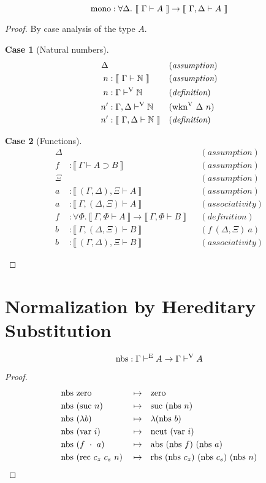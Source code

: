 \documentclass{llncs}
\newtheorem{scase}{Case}
\def\dfn{\mapsto}
\def\arr{\supset}
\def\marr{\rightarrow}
\def\app{\cdot}
\def\lam{\lambda}
\def\nat{\mathbb{N}}
\def\var{\con{var}}
\def\zero{\con{zero}}
\def\suc{\con{suc}}
\def\neut{\con{neut}}
\def\rec{\fun{rec}}
\def\rbs{\fun{rbs}}
\def\abs{\fun{abs}}
\def\mono{\fun{mono}}
\def\nbs{\fun{nbs}}
\def\bydef{(\textit{definition})}
\def\byass{(\textit{assumption})}
\newcommand{\by}[1]{(#1)}
\newcommand{\turn}[1]{\vdash^\con{#1}}
\newcommand{\all}[1]{\forall#1.~}
\newcommand{\el}[1]{\llbracket ~ #1 ~ \rrbracket}
\newcommand{\wknv}[1]{\fun{wkn}^\con{V} ~ \Delta ~ #1}
\newcommand{\con}[1]{\textmd{#1}}
\newcommand{\fun}[1]{\textmd{#1}}
\newcommand{\typm}[1]{\el{\Gamma \vdash #1}}
\newcommand{\gdtypm}[1]{\el{\Gamma, \Delta \vdash #1}}
\newcommand{\gftypm}[1]{\el{\Gamma, \Phi \vdash #1}}
\newcommand{\type}[1]{\Gamma \turn{E} #1}
\newcommand{\typv}[1]{\Gamma \turn{V} #1}
\newcommand{\gdtypv}[1]{\Gamma, \Delta \turn{V} #1}
\begin{document}
\begin{lemma}
\label{lem:mod:mono}
$$
\mono : \all{\Delta} \typm{A} \marr \gdtypm{A}
$$

\begin{proof}

By case analysis of the type $A$.

\begin{scase}[Natural numbers]
\begin{align*}
\Delta& && \byass\\
n  &: \typm{\nat} && \byass\\
n  &: \typv{\nat} && \bydef\\
n' &: \gdtypv{\nat} && \by{\wknv{n}}\\
n' &: \gdtypm{\nat} && \bydef
\end{align*}
\end{scase}

\begin{scase}[Functions]
\begin{align*}
\Delta& && \byass\\
f  &: \typm{A \arr B} && \byass\\
\Xi& && \byass\\
a  &: \el{(\Gamma, \Delta), \Xi \vdash A} && \byass\\
a  &: \el{\Gamma, (\Delta, \Xi) \vdash A} && \by{associativity}\\
f  &: \all{\Phi} \gftypm{A} \marr \gftypm{B} && \bydef\\
b  &: \el{\Gamma, (\Delta, \Xi) \vdash B} && \by{f~(\Delta,\Xi)~a}\\
b  &: \el{(\Gamma, \Delta), \Xi \vdash B} && \by{associativity}
\end{align*}
\end{scase}

\end{proof}

\end{lemma}

\section{Normalization by Hereditary Substitution}

\begin{theorem}
\label{thm:mod:nbs}
$$
\nbs : \type{A} \marr \typv{A}
$$

\begin{proof}
\begin{align*}
&\nbs ~ \zero &&\dfn&& \zero\\
&\nbs ~ (\suc~n) &&\dfn&& \suc ~ (\nbs~n)\\
&\nbs ~ (\lam b) &&\dfn&& \lam (\nbs~b)\\
&\nbs ~ (\var~i) &&\dfn&& \neut ~ (\var~i)\\
&\nbs ~ (f~\app~a) &&\dfn&& \abs ~ (\nbs~f) ~ (\nbs~a)\\
&\nbs ~ (\rec~c_z~c_s~n) &&\dfn&& \rbs~(\nbs~c_z)~(\nbs~c_s)~(\nbs~n)
\end{align*}
\end{proof}

\end{theorem}
\end{document}
